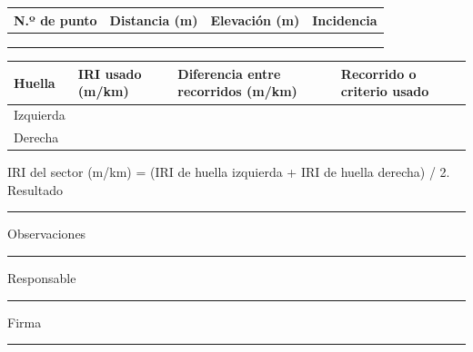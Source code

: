 \begin{tabularx}{\linewidth}{|X|X|X|X|}
\hline
\textbf{N.º de punto} & \textbf{Distancia (m)} & \textbf{Elevación (m)} & \textbf{Incidencia}\\\hline
\rule{0pt}{4mm}&&&\\\hline
\rule{0pt}{4mm}&&&\\\hline
\rule{0pt}{4mm}&&&\\\hline
\end{tabularx}
\begin{tabularx}{\linewidth}{|p{1.45cm}|p{2.6cm}|X|X|}
\hline
\textbf{Huella} & \textbf{IRI usado (m/km)} & \textbf{Diferencia entre recorridos (m/km)} & \textbf{Recorrido o criterio usado}\\\hline
Izquierda&&&\\\hline
Derecha&&&\\\hline
\end{tabularx}
IRI del sector (m/km) = (IRI de huella izquierda + IRI de huella derecha) / 2. Resultado \rule{1.3cm}{0.25pt}\par
Observaciones \rule{9.0cm}{0.25pt}\par
Responsable \rule{3.8cm}{0.25pt}\qquad Firma \rule{3.1cm}{0.25pt}
\endgroup
